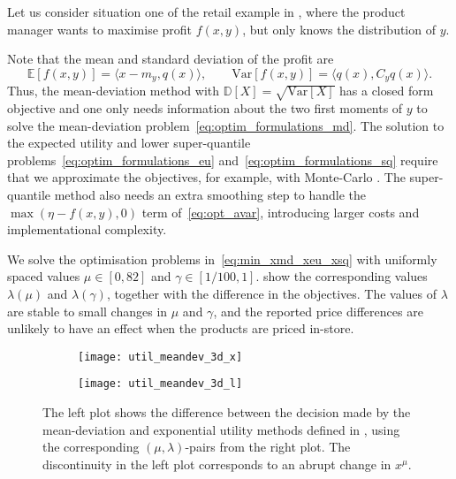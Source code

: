 \documentclass[main.tex]{subfiles}
\begin{document}
\begin{example}
  Let us consider situation one of the retail example in
  , where the product manager wants
  to maximise profit $f(x,y)$, but only knows the distribution of $y$.

  Note that the mean and standard deviation of the profit are
  \begin{equation}
    \mathbb{E}[f(x,y)]
    = \langle x-m_y,q(x) \rangle,\qquad
    \mbox{Var}[f(x,y)]
    = \langle q(x),C_y q(x) \rangle.
  \end{equation}
  Thus, the mean-deviation method with
  $\mathbb{D}[X]=\sqrt{\mbox{Var}[X]}$ has a closed form objective and
  one only needs information about the two first moments of $y$ to solve
  the mean-deviation problem~\eqref{eq:optim_formulations_md}.
  The solution to the expected utility and lower super-quantile
  problems~\eqref{eq:optim_formulations_eu}
  and~\eqref{eq:optim_formulations_sq} require that we approximate the
  objectives, for example, with Monte-Carlo
  \citep{caflisch1998monte}.
  The super-quantile method also needs an extra smoothing step to
  handle the $\max(\eta-f(x,y),0)$ term of~\eqref{eq:opt_avar},
  introducing larger costs and implementational complexity.

  We solve the optimisation problems in~\eqref{eq:min_xmd_xeu_xsq} with
  uniformly spaced values $\mu\in[0,82]$ and $\gamma\in[1/100, 1]$.
   show the
  corresponding values $\lambda(\mu)$ and $\lambda(\gamma)$, together
  with the difference in the objectives. The values of $\lambda$
  are stable to small changes in $\mu$ and $\gamma$, and the
  reported price differences are unlikely to have an effect when
  the products are priced in-store.
  \begin{figure}[htbp]
    \centering
    \begin{subfigure}[t]{.5\textwidth}
      \texttt{[image: util\_meandev\_3d\_x]}
    \end{subfigure}%
    \begin{subfigure}[t]{.5\textwidth}
      \texttt{[image: util\_meandev\_3d\_l]}
    \end{subfigure}
    \caption{The left plot shows the difference between the decision made
      by the mean-deviation and exponential utility methods defined in
      , using the corresponding
      $(\mu,\lambda)$-pairs from the right plot.
      The discontinuity in the left plot corresponds to an abrupt
      change in $x^\mu$.%
    }\label{fig:util_meandev_2d}
  \end{figure}


\end{example}
\end{document}
